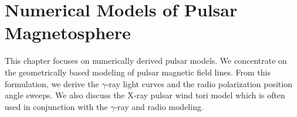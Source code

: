 \chapter{Numerical Models of Pulsar Magnetosphere}
\label{chapter:numericalModels}

This chapter focuses on numerically derived 
pulsar models.  We concentrate on the geometrically based 
modeling of pulsar magnetic field lines.  From this 
formulation, we derive the $\gamma$-ray light curves
and the radio polarization position angle sweeps.  
We also discuss
the X-ray pulsar wind tori model which is often used
in conjunction with the $\gamma$-ray and radio modeling.






